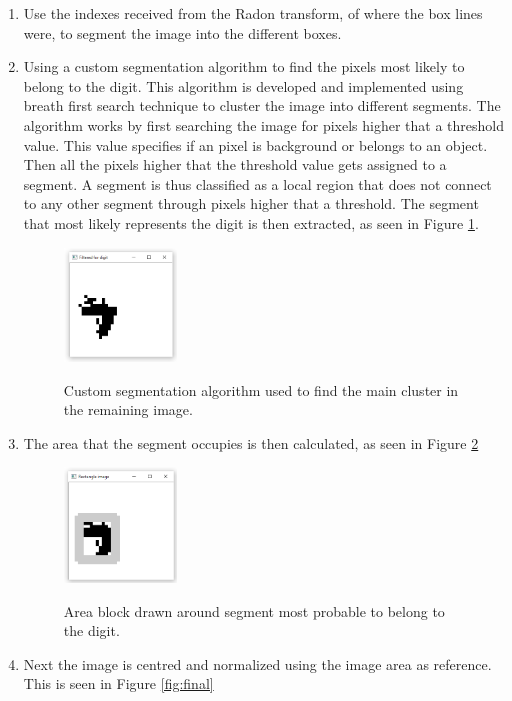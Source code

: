 \begin{enumerate}
\item Use the indexes received from the Radon transform, of where the box lines were, to segment the image into the different boxes.
\item Using a custom segmentation algorithm to find the pixels most likely to belong to the digit. This algorithm is developed and implemented using breath first search technique to cluster the image into different segments. The algorithm works by first searching the image for pixels higher that a threshold value. This value specifies if an pixel is background or belongs to an object. Then all the pixels higher that the threshold value gets assigned to a segment. A segment is thus classified as a local region that does not connect to any other segment through pixels higher that a threshold. The segment that most likely represents the digit is then extracted, as seen in Figure \ref{fig:c}.
\begin{figure}
  \centering
  \includegraphics[width=3cm]{Cluster}\\
  \caption{Custom segmentation algorithm used to find the main cluster in the remaining image.}
  \label{fig:c}
\end{figure}

\item The area that the segment occupies is then calculated, as seen in Figure \ref{fig:areaLoc}

\begin{figure}
  \centering
  \includegraphics[width=3cm]{DetectArea}\\
  \caption{Area block drawn around segment most probable to belong to the digit.}
  \label{fig:areaLoc}
\end{figure}

\item Next the image is centred and normalized using the image area as reference.  This is seen in Figure \ref{fig:final}


\end{enumerate}

